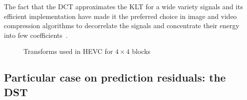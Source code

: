 \documentclass[11pt,a4paper,openright,twoside]{book}
\numberwithin{equation}{section} %
\numberwithin{figure}{section} %
\numberwithin{table}{section} %
\begin{document}
The fact that the \ac{DCT} approximates the \ac{KLT} for a wide variety
signals and its efficient implementation have made it the preferred
choice in image and video compression algorithms to decorrelate the
signals and concentrate their energy into few
coefficients~\cite{sole-12-transform-coefficient-coding}.

\begin{figure}[tb]
	\centering
	\hspace{0.2\linewidth}
	\caption{Transforms used in \ac{HEVC} for $4\times4$ blocks}
	\label{fig:dct_dst}
\end{figure}

\subsection{Particular case on prediction residuals: the \acs{DST}}
\label{sub:particular_case_dst}
\end{document}
